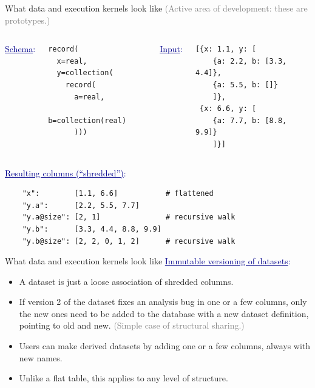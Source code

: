 \documentclass{beamer}
\begin{document}
\begin{frame}[fragile]{What data and execution kernels look like}
\vspace{0.5 cm}
\textcolor{gray}{(Active area of development: these are prototypes.)}
\small

\vspace{0.5 cm}
\begin{columns}
\textcolor{darkblue}{\normalsize \underline{Schema}:}
\vspace{-0.1 cm}
\begin{verbatim}
record(
  x=real,
  y=collection(
    record(
      a=real,
      b=collection(real)
      )))
\end{verbatim}

\textcolor{darkblue}{\normalsize \underline{Input}:}
\vspace{-0.1 cm}
\begin{verbatim}
[{x: 1.1, y: [
    {a: 2.2, b: [3.3, 4.4]},
    {a: 5.5, b: []}
    ]},
 {x: 6.6, y: [
    {a: 7.7, b: [8.8, 9.9]}
    ]}]
\end{verbatim}
\end{columns}

\vspace{0.5 cm}
\textcolor{darkblue}{\normalsize \underline{Resulting columns (``shredded'')}:}
\vspace{-0.1 cm}
\begin{verbatim}
    "x":        [1.1, 6.6]           # flattened
    "y.a":      [2.2, 5.5, 7.7]
    "y.a@size": [2, 1]               # recursive walk
    "y.b":      [3.3, 4.4, 8.8, 9.9]
    "y.b@size": [2, 2, 0, 1, 2]      # recursive walk
\end{verbatim}
\end{frame}

\begin{frame}[fragile]{What data and execution kernels look like}
\vspace{0.5 cm}
\textcolor{darkblue}{\underline{Immutable versioning of datasets}:}

\vspace{0.25 cm}
\begin{itemize}\setlength{\itemsep}{0.25 cm}
\item A dataset is just a loose association of shredded columns.
\item If version 2 of the dataset fixes an analysis bug in one or a few columns, only the new ones need to be added to the database with a new dataset definition, pointing to old and new. \textcolor{gray}{(Simple case of structural sharing.)}
\item Users can make derived datasets by adding one or a few columns, always with new names.
\item Unlike a flat table, this applies to any level of structure.
\end{itemize}
\end{frame}
\end{document}
